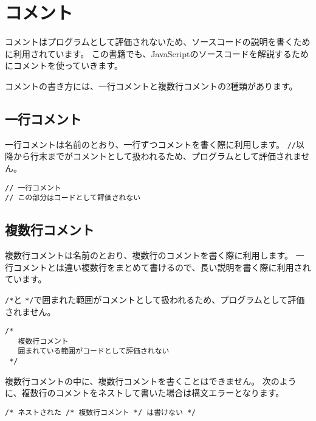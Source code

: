 \hypertarget{comment}{%
\chapter{コメント}\label{comment}}
\thispagestyle{frontheadings}

コメントはプログラムとして評価されないため、ソースコードの説明を書くために利用されています。
この書籍でも、JavaScriptのソースコードを解説するためにコメントを使っていきます。

コメントの書き方には、一行コメントと複数行コメントの2種類があります。

\hypertarget{single-line-comment}{%
\section{一行コメント}\label{single-line-comment}}

一行コメントは名前のとおり、一行ずつコメントを書く際に利用します。
\texttt{//}以降から行末までがコメントとして扱われるため、プログラムとして評価されません。

\begin{lstlisting}
// 一行コメント
// この部分はコードとして評価されない
\end{lstlisting}

\hypertarget{multi-line-comment}{%
\section{複数行コメント}\label{multi-line-comment}}

複数行コメントは名前のとおり、複数行のコメントを書く際に利用します。
一行コメントとは違い複数行をまとめて書けるので、長い説明を書く際に利用されています。

\texttt{/*}と
\texttt{*/}で囲まれた範囲がコメントとして扱われるため、プログラムとして評価されません。

\begin{lstlisting}
/* 
   複数行コメント
   囲まれている範囲がコードとして評価されない
 */
\end{lstlisting}

複数行コメントの中に、複数行コメントを書くことはできません。
次のように、複数行のコメントをネストして書いた場合は構文エラーとなります。

\begin{lstlisting}
/* ネストされた /* 複数行コメント */ は書けない */
\end{lstlisting}

